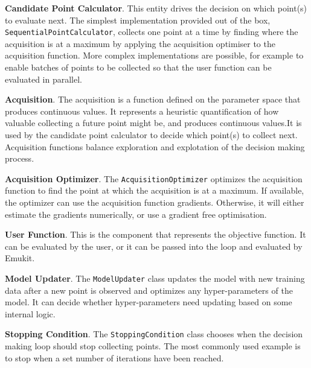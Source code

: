  

\textbf{Candidate Point Calculator}. This entity drives the decision on which point(s) to evaluate next. The simplest implementation provided out of the box, \texttt{SequentialPointCalculator}, collects one point at a time by finding where the acquisition is at a maximum by applying the acquisition optimiser to the acquisition function. More complex implementations are possible, for example to enable batches of points to be collected so that the user function can be evaluated in parallel.

\textbf{Acquisition}. The acquisition is a function defined on the parameter space that produces continuous values. It represents a heuristic quantification of how valuable collecting a future point might be, and produces continuous values.It is used by the candidate point calculator to decide which point(s) to collect next. Acquisition functions balance exploration and explotation of the decision making process.

\textbf{Acquisition Optimizer}. The \texttt{AcquisitionOptimizer} optimizes the acquisition function to find the point at which the acquisition is at a maximum. If available, the optimizer can use the acquisition function gradients. Otherwise, it will either estimate the gradients numerically, or use a gradient free optimisation.

\textbf{User Function}. This is the component that represents the objective function. It can be evaluated by the user, or it can be passed into the loop and evaluated by Emukit.

\textbf{Model Updater}. The \texttt{ModelUpdater} class updates the model with new training data after a new point is observed and optimizes any hyper-parameters of the model. It can decide whether hyper-parameters need updating based on some internal logic.

\textbf{Stopping Condition}. The \texttt{StoppingCondition} class chooses when the decision making loop should stop collecting points. The most commonly used example is to stop when a set number of iterations have been reached.

